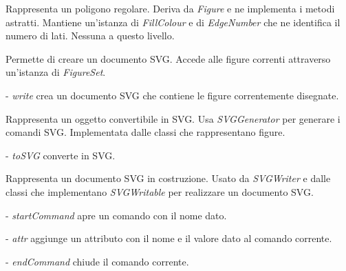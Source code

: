 Rappresenta un poligono regolare.
Deriva da \textit{Figure} e ne implementa i metodi astratti. Mantiene un'istanza di \textit{FillColour} e di \textit{EdgeNumber} che ne identifica il numero di lati.
Nessuna a questo livello.

Permette di creare un documento SVG.
Accede alle figure correnti attraverso un'istanza di \textit{FigureSet}.
\begin{elencopuntato}[\normindent]
\item[-] \textit{write} crea un documento SVG che contiene le figure correntemente disegnate.
\end{elencopuntato}

Rappresenta un oggetto convertibile in SVG.
Usa \textit{SVGGenerator} per generare i comandi SVG.
Implementata dalle classi che rappresentano figure.
\begin{elencopuntato}[\normindent]
\item[-] \textit{toSVG} converte in SVG.
\end{elencopuntato}

Rappresenta un documento SVG in costruzione.
Usato da \textit{SVGWriter} e dalle classi che implementano \textit{SVGWritable} per realizzare un documento SVG.
\begin{elencopuntato}[\normindent]
\item[-] \textit{startCommand} apre un comando con il nome dato.
\item[-] \textit{attr} aggiunge un attributo con il nome e il valore dato al comando corrente.
\item[-] \textit{endCommand} chiude il comando corrente.
\end{elencopuntato}

